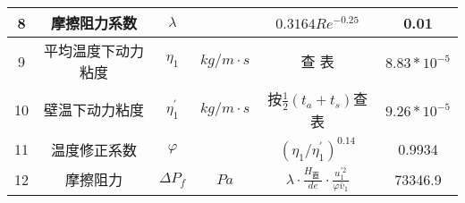 \begin{table}[H]
{\begin{tabular}{|c|c|c|c|c|c|}
            8    & 摩擦阻力系数       & $ \lambda $        &                                                & $ 0.3164Re^{-0.25} $                                                                             & 0.01             \\ \hline
            9    & 平均温度下动力粘度 & $ \eta_{1} $       & $ kg/m \cdot s $                               & 查 表                                                                                            & $ 8.83*10^{-5} $ \\ \hline
            10   & 壁温下动力粘度     & $ \eta_{1}^{'} $   & $ kg/m \cdot s $                               & 按$ \frac{1}{2}(t_a + t_s) $查表                                                                 & $ 9.26*10^{-5} $ \\ \hline
            11   & 温度修正系数       & $ \varphi $        &                                                & $ \left(\eta_{1} / \eta_{1}^{\prime}\right)^{0.14} $                                             & 0.9934           \\ \hline
            12   & 摩擦阻力           & $ \Delta P_f $     & $ Pa $                                         & $ \lambda \cdot \frac{H_{\text {直 }}}{d e} \cdot \frac{u_{1}^{\prime 2}}{\varphi \bar{v}_{1}} $ & 73346.9          \\ \hline
        \end{tabular}
    }
\end{table}

